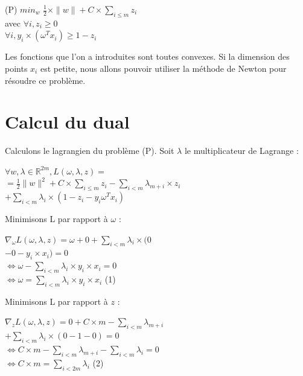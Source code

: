 \documentclass{article}
\begin{document}
           \begin{centre}
           (P) $min_{w}$ $\frac{1}{2} \times \|w\| + C \times \sum_{i \leq m}z_i$\\
           avec $\forall i, z_i \geq 0$\\
           $\forall i, y_i \times (\omega^{T} x_i) \geq 1 - z_i$\\
           \end{centre}

\bigskip

Les fonctions que l'on a introduites sont toutes convexes. Si la dimension des points $x_i$ est petite, nous allons pouvoir utiliser la méthode de Newton pour résoudre ce problème.

\section{Calcul du dual}

Calculons le lagrangien du problème (P). Soit $\lambda$ le multiplicateur de Lagrange :

              \begin{center}
              $\forall w, \lambda \in \mathbb{R}^{2m}, L(\omega, \lambda, z) = $\\
              $= \frac{1}{2} \|w\|^2 + C \times \sum_{i \leq m} z_i - \sum_{i < m} \lambda_{m+i} \times z_i$\\
              $+ \sum_{i < m} \lambda_i \times (1 - z_i - y_i \omega^{T} x_i)$\\
              \end{center}

Minimisons L par rapport à $\omega$ :\\

              \begin{center}
              $\nabla_{\omega} L(\omega, \lambda, z) = \omega + 0 + \sum_{i < m} \lambda_i \times (0$\\
              $- 0 - y_i \times x_i) = 0$\\
              $\Leftrightarrow \omega - \sum_{i < m} \lambda_i \times y_i \times x_i = 0$\\
              $\Leftrightarrow \omega = \sum_{i < m} \lambda_i \times y_i \times x_i$ (1)\\
              \end{center}

Minimisons L par rapport à $z$ :\\

              \begin{center}
              $\nabla_{z} L(\omega, \lambda, z) = 0 + C \times m - \sum_{i < m} \lambda_{m+i} $\\
              $+ \sum_{i < m} \lambda_i \times (0 - 1 - 0) = 0$\\
              $\Leftrightarrow C \times m - \sum_{i < m} \lambda_{m+i} - \sum_{i < m} \lambda_i = 0$\\
              $\Leftrightarrow  C \times m = \sum_{i < 2m} \lambda_i$ (2)\\
              \end{center}
\end{document}
